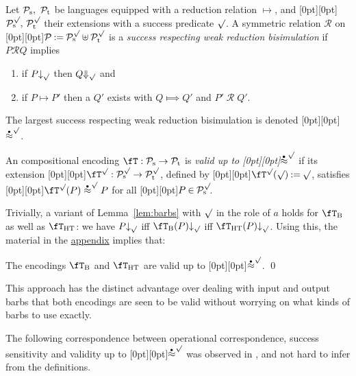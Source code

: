 \documentclass[runningheads]{llncs}
\newcommand{\lem}[1]{Lemma~\ref{lem:#1}}
\newcommand{\T}{\mathcal{P}}             %
\newcommand{\fTHT}{\fT_{\textrm{HT}}}       %
\newcommand{\plat}[1]{\raisebox{0pt}[0pt][0pt]{#1}}     %
\newcommand{\wbb}{\stackrel{\raisebox{-1pt}[0pt][0pt]{$\scriptscriptstyle \bullet$}}{\approx}}
\newcommand{\wssbb}{\wbb^\surd}
\newcommand{\scomm}{\sbarb}
\newcommand{\sbarb}[1]{{\downarrow_{#1}}}
\newcommand{\ocomm}[1]{{\Downarrow_{#1}}}
\newcommand{\mrel}{\ensuremath{\mathrel{\mathcal{R}}}}
\begin{document}
\begin{definition}\rm\label{df:success bis}
Let $\mathcal{P}_{\rm s},~\mathcal{P}_{\rm t}$ be languages equipped with a reduction relation
$\longmapsto$, and \plat{$\mathcal{P}_{\rm s}^\surd,\,\mathcal{P}_{\rm t}^\surd$} their extensions with a success predicate $\surd$.
A symmetric relation {\mrel} on \plat{$\T\mathbin{:=}\T_{\rm s}^\surd \uplus \T_{\rm t}^\surd$} is a {\em success respecting weak reduction bisimulation}
if $P\mathbin{\mrel} Q$ implies
\begin{enumerate}
\item if $P \sbarb \surd$ then $Q \ocomm \surd$ and
\item if $P \longmapsto P'$ then a $Q'$ exists with
  $Q \Longmapsto Q'$ and $P'\mathop{\mrel} Q'$.%
\end{enumerate}
The largest success respecting weak reduction bisimulation is denoted \plat{$\wssbb$}.

An compositional encoding $\fT:\T_{\rm s} \rightarrow \T_{\rm t}$ is \emph{valid up to \plat{$\wssbb$}}
if its extension \plat{$\fT^\surd_{~}:\T_{\rm s}^\surd \rightarrow \T_{\rm t}^\surd$}, defined by \plat{$\fT^\surd(\surd)\mathbin{:=}\surd$},
satisfies \plat{$\fT^\surd(P) \wssbb P$} for all \plat{$P\mathbin\in \T_{\rm s}^\surd\!$}.
\end{definition}
Trivially, a variant of \lem{barbs} with $\surd$ in the role of $a$ holds for $\fT_{\rm B}$ as well
as $\fTHT$: we have $P \scomm \surd$ iff $\fT_{\rm B}(P) \scomm \surd$ iff $\fTHT(P) \scomm \surd$.
Using this, the material in the \hyperlink{appendix}{appendix} implies that:

\begin{theorem}\rm\label{thm:wssbb}
  The encodings $\fT_{\rm B}$ and $\fTHT$ are valid up to \plat{$\wssbb$}.
  \qed
\end{theorem}
This approach has the distinct advantage over dealing with input and output barbs that both
encodings are seen to be valid without worrying on what kinds of barbs to use exactly.

The following correspondence between operational correspondence, success sensitivity and validity up
to \plat{$\wssbb$} was observed in \cite{EPTCS190.4}, and not hard to infer from the definitions.
\end{document}
